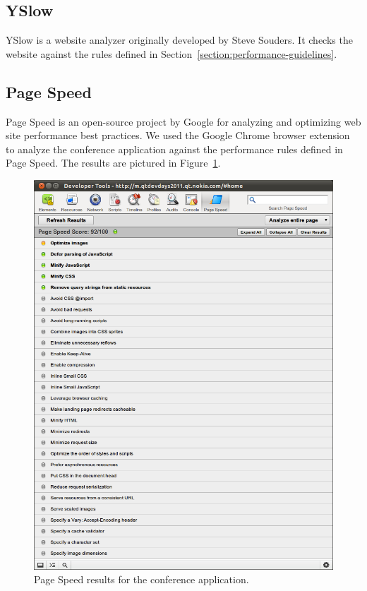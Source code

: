 \subsection{YSlow}

YSlow is a website analyzer originally developed by Steve Souders. It
checks the website against the rules defined in
Section~\ref{section:performance-guidelines}.


\subsection{Page Speed}

Page Speed \citationneeded is an open-source project by Google for
analyzing and optimizing web site performance best practices. We used
the Google Chrome browser extension to analyze the conference
application against the performance rules defined in Page Speed. The
results are pictured in Figure~\ref{figure:devdays-pagespeed.png}.

\begin{figure}[ht]
  \begin{center}
    \includegraphics[width=\textwidth]{images/devdays-pagespeed.png}
    \caption{Page Speed results for the conference application.}
    \label{figure:devdays-pagespeed.png}
  \end{center}
\end{figure}

